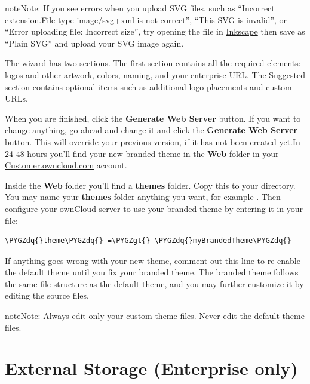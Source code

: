 \documentclass[letterpaper,10pt,english]{sphinxmanual}
\def\PYGZgt{\char`\>}
\def\PYGZdq{\char`\"}
\begin{document}
\begin{notice}{note}{Note:}
If you see errors when you upload SVG files, such as ``Incorrect
extension.File type image/svg+xml is not correct'', ``This SVG is invalid'',
or ``Error uploading file: Incorrect size'', try opening the file in
\href{https://inkscape.org/en/}{Inkscape} then save as ``Plain SVG'' and
upload your SVG image again.
\end{notice}

The wizard has two sections. The first section contains all the required
elements: logos and other artwork, colors, naming, and your enterprise URL. The
Suggested section contains optional items such as additional logo placements
and custom URLs.

When you are finished, click the \textbf{Generate Web Server} button. If you want to
change anything, go ahead and change it and click the \textbf{Generate Web Server}
button. This will override your previous version, if it has not been created
yet.In 24-48 hours you'll find your new branded theme in the \textbf{Web} folder in
your \href{https://customer.owncloud.com/owncloud}{Customer.owncloud.com} account.

Inside the \textbf{Web} folder you'll find a \textbf{themes} folder. Copy this to your
 directory. You may name your \textbf{themes} folder anything you
want, for example . Then configure your ownCloud server to
use your branded theme by entering it in your  file:

\begin{Verbatim}[commandchars=\\\{\}]
\PYGZdq{}theme\PYGZdq{} =\PYGZgt{} \PYGZdq{}myBrandedTheme\PYGZdq{}
\end{Verbatim}

If anything goes wrong with your new theme, comment out this line to re-enable
the default theme until you fix your branded theme. The branded theme follows
the same file structure as the default theme, and you may further customize it
by editing the source files.

\begin{notice}{note}{Note:}
Always edit only your custom theme files. Never edit the default
theme files.
\end{notice}


\section{External Storage (Enterprise only)}
\label{enterprise_external_storage/index:external-storage-enterprise-only}\label{enterprise_external_storage/index::doc}
\end{document}
